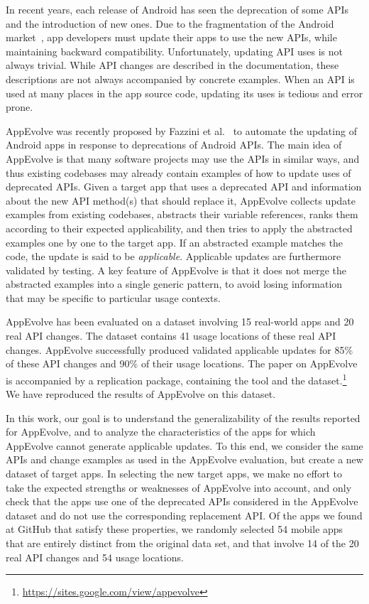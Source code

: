 In recent years, each release of Android has seen the deprecation of some
APIs and the introduction of new ones.  Due to the fragmentation of the
Android market~\cite{he2018understanding,li2018cid}, app developers must
update their apps to use the new APIs, while maintaining backward
compatibility.  Unfortunately, updating API uses is not always trivial.
While API changes are described in the documentation, these descriptions
are not always accompanied by concrete examples.  When an API is used at
many places in the app source code, updating its uses is tedious and
error prone.

AppEvolve was recently proposed by Fazzini et
al.~\cite{fazzini2019automated} to automate the updating of Android apps in
response to deprecations of Android APIs.  The main idea of AppEvolve is
that many software projects may use the APIs in similar ways, and thus
existing codebases may already contain examples of how to update uses of
deprecated APIs.  Given a target app that uses a deprecated API and
information about the new API method(s) that should replace it, AppEvolve
collects update examples from existing codebases, abstracts their variable
references, ranks them according to their expected applicability, and then
tries to apply the abstracted examples one by one to the target app.  If an
abstracted example matches the code, the update is said to be {\em
applicable}.  Applicable updates are furthermore validated by testing.  A
key feature of AppEvolve is that it does not merge the abstracted examples
into a single generic pattern, to avoid losing information that may be
specific to particular usage contexts.

AppEvolve has been evaluated on a dataset involving 15 real-world apps and
20 real API changes. The dataset contains 41 usage locations of these real
 API changes. AppEvolve successfully produced validated applicable updates
for 85\% of these API changes and 90\% of their usage locations.  The
paper on AppEvolve is accompanied by a replication package, containing the
tool and the
dataset.\footnote{\url{https://sites.google.com/view/appevolve}} We have
reproduced the results of AppEvolve on this dataset.

In this work, our goal is to understand the generalizability of the results
reported for AppEvolve, and to analyze the characteristics of the apps for
which AppEvolve cannot generate applicable updates.  To this end, we
consider the same APIs and change examples as used in the AppEvolve
evaluation, but create a new dataset of target apps.  In selecting the new
target apps, we make no effort to take the expected strengths or weaknesses
of AppEvolve into account, and only check that the apps use one of the
deprecated APIs considered in the AppEvolve dataset and do not use the
corresponding replacement API.  Of the apps we found at GitHub that satisfy
these properties, we randomly selected 54 mobile apps that are entirely
distinct from the original data set, and that involve 14 of the 20 real API
changes and 54 usage locations.

